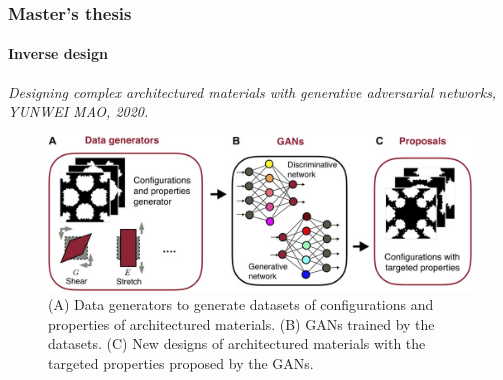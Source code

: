 \documentclass[
	10pt, %
]{beamer}
\begin{document}
\begin{frame}
	\frametitle{Master's thesis}
	\framesubtitle{Inverse design}
	\textit{Designing complex architectured materials with generative adversarial networks, YUNWEI MAO, 2020.}
	\begin{figure}
		\includegraphics[width=0.8\linewidth]{figures/ML_procedure.jpeg}
		\caption{(A) Data generators to generate datasets of configurations and properties of architectured materials. (B) GANs trained by the datasets. (C) New designs of architectured materials with the targeted properties proposed by the GANs.}
	\end{figure}
\end{frame}
\end{document}
